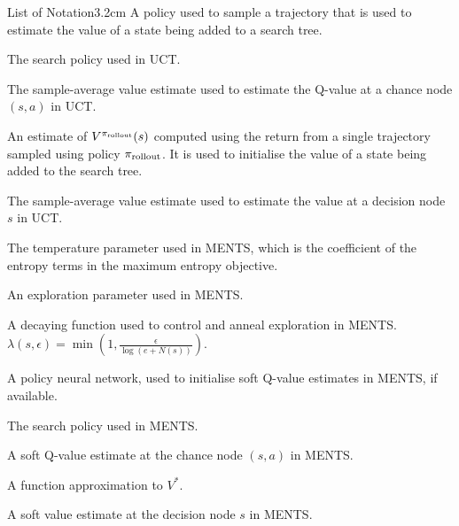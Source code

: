 \begin{mclistof}{List of Notation}{3.2cm}
        A policy used to sample a trajectory that is used to estimate the value of a state being added to a search tree.
    \item[$\piuct$] 
        The search policy used in UCT.
    \item[$\Quct(s,a)$] 
        The sample-average value estimate used to estimate the Q-value at a chance node $(s,a)$ in UCT.
    \item[$\Quctnorm(s,a)$] 
    \item[$\hat{V}^{\pirollout}(s)$] 
        An estimate of $V^{{\pi_{{\textnormal{rollout}}}}}(s)$ computed using the return from a single trajectory sampled using policy ${\pi_{{\textnormal{rollout}}}}$. It is used to initialise the value of a state being added to the search tree.
    \item[$\Vuct(s)$] 
        The sample-average value estimate used to estimate the value at a decision node $s$ in UCT.  %
    \\
    \item[$\alphaments$] 
        The temperature parameter used in MENTS, which is the coefficient of the entropy terms in the maximum entropy objective.
    \item[$\epsments$]
        An exploration parameter used in MENTS.
    \item[$\lambda(s,\epsilon)$] 
        A decaying function used to control and anneal exploration in MENTS. $\lambda(s,\epsilon) = \min\left(1,\frac{\epsilon}{\log(e+N(s))}\right)$.
    \item[$\tilde{\pi}$] 
        A policy neural network, used to initialise soft Q-value estimates in MENTS, if available. 
    \item[$\piments$] 
        The search policy used in MENTS.
    \item[$\Qments(s,a)$] 
        A soft Q-value estimate at the chance node $(s,a)$ in MENTS.
    \item[$\tilde{V}$] 
        A function approximation to $V^*$.
    \item[$\Vments(s)$] 
        A soft value estimate at the decision node $s$ in MENTS. %
    \\

\end{mclistof}
